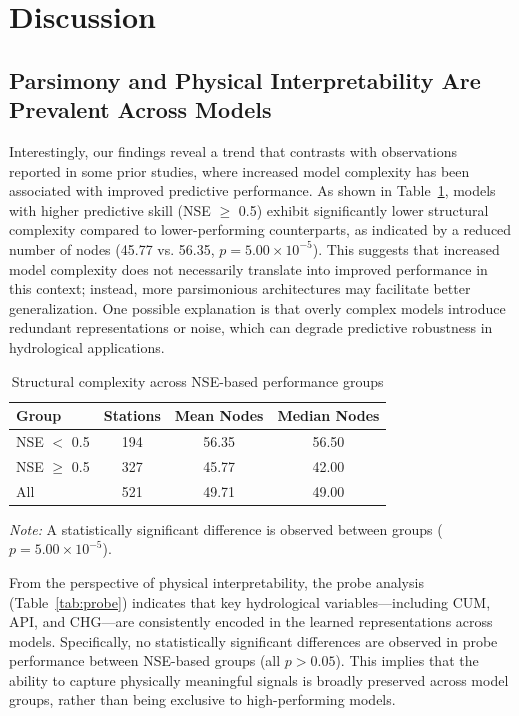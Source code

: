 \section{Discussion}
\subsection{Parsimony and Physical Interpretability Are Prevalent Across Models}
Interestingly, our findings reveal a trend that contrasts with observations reported in some prior studies\cite{DONG2024130941,ZHOU2024132235}, where increased model complexity has been associated with improved predictive performance. As shown in Table~\ref{tab:complexity}, models with higher predictive skill (NSE $\geq$ 0.5) exhibit significantly lower structural complexity compared to lower-performing counterparts, as indicated by a reduced number of nodes (45.77 vs. 56.35, $p = 5.00 \times 10^{-5}$). This suggests that increased model complexity does not necessarily translate into improved performance in this context; instead, more parsimonious architectures may facilitate better generalization\cite{ORTH2015147}. One possible explanation is that overly complex models introduce redundant representations or noise, which can degrade predictive robustness in hydrological applications\cite{Wrr_PGDL}.

\begin{table}[htbp]
    \centering
    \caption{Structural complexity across NSE-based performance groups}
    \begin{tabular*}{\textwidth}{@{\extracolsep{\fill}}lccc}
        \toprule
        Group & Stations & Mean Nodes & Median Nodes \\
        \midrule
        NSE $<$ 0.5    & 194 & 56.35 & 56.50 \\
        NSE $\geq$ 0.5 & 327 & 45.77 & 42.00 \\
        All            & 521 & 49.71 & 49.00 \\
        \bottomrule
    \end{tabular*}

    \vspace{3pt}
    \begin{minipage}{\textwidth}
        \footnotesize
        \textit{Note:} A statistically significant difference is observed between groups ($p = 5.00 \times 10^{-5}$).
    \end{minipage}
    \label{tab:complexity}
\end{table}

From the perspective of physical interpretability, the probe analysis (Table~\ref{tab:probe}) indicates that key hydrological variables—including CUM, API, and CHG—are consistently encoded in the learned representations across models\cite{pmlr-v97-verma19a}. Specifically, no statistically significant differences are observed in probe performance between NSE-based groups (all $p > 0.05$). This implies that the ability to capture physically meaningful signals is broadly preserved across model groups\cite{e24050687_Shap_problem}, rather than being exclusive to high-performing models.

